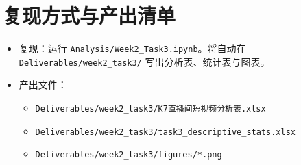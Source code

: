 \documentclass[UTF8,a4paper,11pt]{ctexart}
\begin{document}
\section{复现方式与产出清单}
\begin{itemize}
  \item 复现：运行 \texttt{Analysis/Week2\_Task3.ipynb}。将自动在 \texttt{Deliverables/week2\_task3/} 写出分析表、统计表与图表。
  \item 产出文件：
    \begin{itemize}
      \item \texttt{Deliverables/week2\_task3/K7直播间短视频分析表.xlsx}
      \item \texttt{Deliverables/week2\_task3/task3\_descriptive\_stats.xlsx}
      \item \texttt{Deliverables/week2\_task3/figures/*.png}
    \end{itemize}
\end{itemize}
\end{document}
